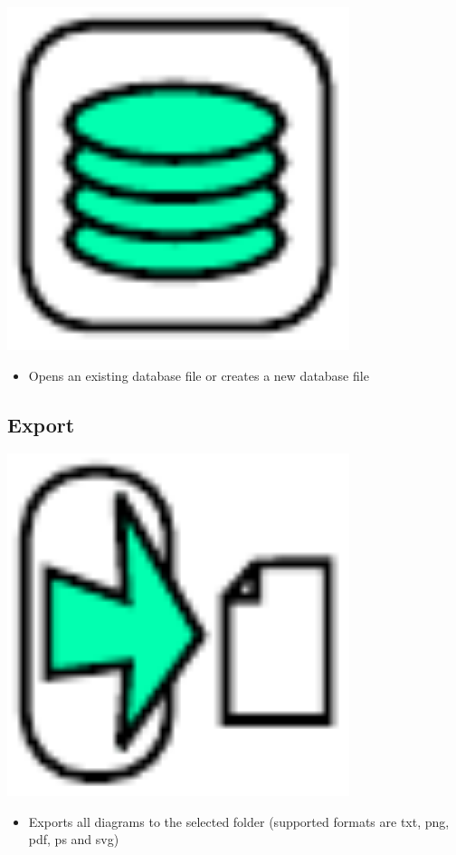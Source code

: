 \includegraphics[width=10cm]{../../gui/source/resources/file_use_db.pdf}
\begin{itemize}
\item Opens an existing database file or creates a new database file
\end{itemize}

\subsection{Export}

\includegraphics[width=10cm]{../../gui/source/resources/file_export.pdf}
\begin{itemize}
\item Exports all diagrams to the selected folder (supported formats are txt, png, pdf, ps and svg)
\end{itemize}

